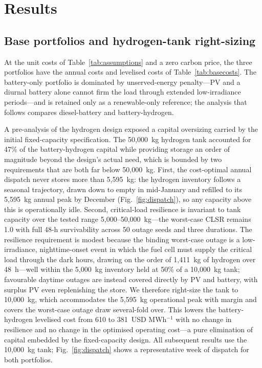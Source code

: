 \documentclass[preprint,12pt]{elsarticle}
\begin{document}
\section{Results}
\label{sec:results}

\subsection{Base portfolios and hydrogen-tank right-sizing}
\label{sub:base}
At the unit costs of Table~\ref{tab:assumptions} and a zero carbon price, the three
portfolios have the annual costs and levelised costs of Table~\ref{tab:basecosts}.
The battery-only portfolio is dominated by unserved-energy penalty---PV
and a diurnal battery alone cannot firm the load through extended low-irradiance
periods---and is retained only as a renewable-only reference; the analysis that
follows compares diesel-battery and battery-hydrogen.

A pre-analysis of the hydrogen design exposed a capital oversizing carried by the
initial fixed-capacity specification. The 50{,}000~kg hydrogen tank accounted for
47\% of the battery-hydrogen capital while providing storage an order of
magnitude beyond the design's actual need, which is bounded by two requirements
that are both far below 50{,}000~kg. First, the cost-optimal annual dispatch never
stores more than 5{,}595~kg: the hydrogen inventory follows a seasonal trajectory,
drawn down to empty in mid-January and refilled to its 5{,}595~kg annual peak by
December (Fig.~\ref{fig:dispatch}), so any capacity above this is operationally
idle. Second, critical-load resilience is invariant to tank capacity over the
tested range 5{,}000--50{,}000~kg---the worst-case CLSR remains 1.0 with full 48-h
survivability across 50 outage seeds and three durations. The resilience
requirement is modest because the binding worst-case outage is a low-irradiance,
nighttime-onset event in which the fuel cell must supply the critical load through
the dark hours, drawing on the order of 1{,}411~kg of hydrogen over 48~h---well
within the 5{,}000~kg inventory held at 50\% of a 10{,}000~kg tank; favourable
daytime outages are instead covered directly by PV and battery, with surplus PV
even replenishing the store. We therefore right-size the tank to 10{,}000~kg, which
accommodates the 5{,}595~kg operational peak with margin and covers the worst-case
outage draw several-fold over. This lowers the battery-hydrogen levelised
cost from 610 to 381~USD MWh$^{-1}$ with no change in resilience and no change in
the optimised operating cost---a pure elimination of capital embedded by the
fixed-capacity design. All subsequent results use the 10{,}000~kg tank;
Fig.~\ref{fig:dispatch} shows a representative week of dispatch for both portfolios.
\end{document}
